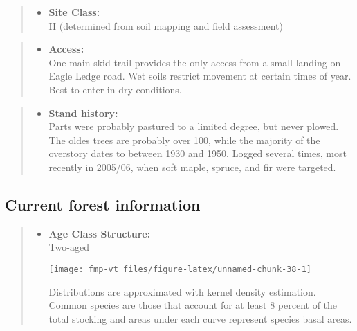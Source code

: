 \documentclass[]{tufte-handout}
\providecommand{\tightlist}{%
  \setlength{\itemsep}{0pt}\setlength{\parskip}{0pt}}
\begin{document}
\begin{quote}
\begin{itemize}
\tightlist
\item
  \textbf{Site Class:}\\
  \vspace{2pt} II (determined from soil mapping and field assessment)
\end{itemize}
\end{quote}

\begin{quote}
\begin{itemize}
\tightlist
\item
  \textbf{Access:}\\
  \vspace{2pt} One main skid trail provides the only access from a small
  landing on Eagle Ledge road. Wet soils restrict movement at certain
  times of year. Best to enter in dry conditions.
\end{itemize}
\end{quote}

\begin{quote}
\begin{itemize}
\tightlist
\item
  \textbf{Stand history:}\\
  \vspace{2pt} Parts were probably pastured to a limited degree, but
  never plowed. The oldes trees are probably over 100, while the
  majority of the overstory dates to between 1930 and 1950. Logged
  several times, most recently in 2005/06, when soft maple, spruce, and
  fir were targeted.
\end{itemize}
\end{quote}

\subsection{Current forest
information}\label{current-forest-information-6}

\begin{quote}
\begin{itemize}
\tightlist
\item
  \textbf{Age Class Structure:}\\
  \vspace{2pt} Two-aged\\

  \begin{marginfigure}
  \texttt{[image: fmp-vt\_files/figure-latex/unnamed-chunk-38-1]} \caption[Distributions are approximated with kernel density estimation]{Distributions are approximated with kernel density estimation. Common species are those that account for at least 8 percent of the total stocking and areas under each curve represent species basal areas.}\label{fig:unnamed-chunk-38}
  \end{marginfigure}
\end{itemize}
\end{quote}
\end{document}
